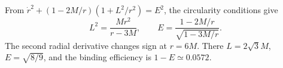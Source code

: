 \begin{enumerate}[leftmargin=2.8em,itemsep=1.2em]
From \(\dot r^2+(1-2M/r)(1+L^2/r^2)=E^2\), the circularity conditions give
\[
 L^2=\frac{Mr^2}{r-3M},\qquad
 E=\frac{1-2M/r}{\sqrt{1-3M/r}}.
\]
The second radial derivative changes sign at \(r=6M\).  There
\(L=2\sqrt3M\), \(E=\sqrt{8/9}\), and the binding efficiency is
\(1-E\simeq0.0572\).
\end{enumerate}
